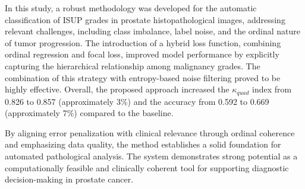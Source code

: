 In this study, a robust methodology was developed for the automatic classification of ISUP grades in prostate histopathological images, addressing relevant challenges, including class imbalance, label noise, and the ordinal nature of tumor progression. The introduction of a hybrid loss function, combining ordinal regression and focal loss, improved model performance by explicitly capturing the hierarchical relationship among malignancy grades. The combination of this strategy with entropy-based noise filtering proved to be highly effective. Overall, the proposed approach increased the $\kappa_{quad}$ index from 0.826 to 0.857 (approximately 3\%) and the accuracy from 0.592 to 0.669 (approximately 7\%) compared to the baseline.

By aligning error penalization with clinical relevance through ordinal coherence and emphasizing data quality, the method establishes a solid foundation for automated pathological analysis. The system demonstrates strong potential as a computationally feasible and clinically coherent tool for supporting diagnostic decision-making in prostate cancer.
